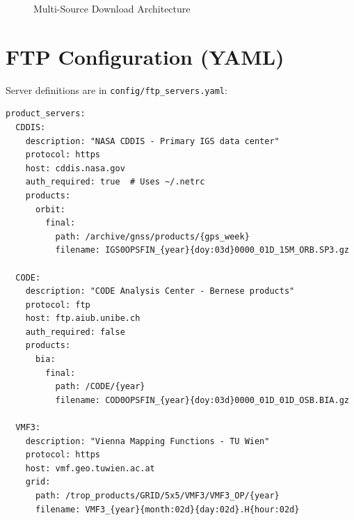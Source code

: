 \documentclass[11pt,a4paper,twoside]{report}
\newcommand{\code}[1]{\texttt{\small\color{primaryblue}#1}}
\begin{document}
\begin{figure}[H]
\centering
{}
\caption{Multi-Source Download Architecture}
\label{fig:download-arch}
\end{figure}

\section{FTP Configuration (YAML)}

Server definitions are in \code{config/ftp\_servers.yaml}:

\begin{lstlisting}[style=yamlstyle, caption={FTP Server Configuration}, label={lst:ftp-config}]
product_servers:
  CDDIS:
    description: "NASA CDDIS - Primary IGS data center"
    protocol: https
    host: cddis.nasa.gov
    auth_required: true  # Uses ~/.netrc
    products:
      orbit:
        final:
          path: /archive/gnss/products/{gps_week}
          filename: IGS0OPSFIN_{year}{doy:03d}0000_01D_15M_ORB.SP3.gz

  CODE:
    description: "CODE Analysis Center - Bernese products"
    protocol: ftp
    host: ftp.aiub.unibe.ch
    auth_required: false
    products:
      bia:
        final:
          path: /CODE/{year}
          filename: COD0OPSFIN_{year}{doy:03d}0000_01D_01D_OSB.BIA.gz

  VMF3:
    description: "Vienna Mapping Functions - TU Wien"
    protocol: https
    host: vmf.geo.tuwien.ac.at
    grid:
      path: /trop_products/GRID/5x5/VMF3/VMF3_OP/{year}
      filename: VMF3_{year}{month:02d}{day:02d}.H{hour:02d}
\end{lstlisting}
\end{document}
